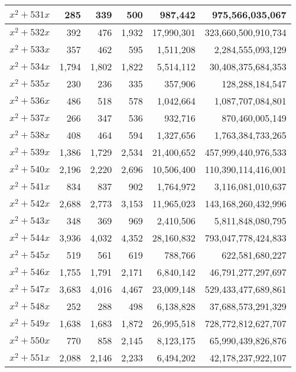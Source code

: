 \documentclass[a4paper]{amsproc}
\theoremstyle{plain}
\begin{document}
\begin{longtable}{ | l | r | r | r | r | r | }
$x^2 + 531x$ & 285 & 339 & 500 & 987{,}442 & 975{,}566{,}035{,}067 \\ \hline
$x^2 + 532x$ & 392 & 476 & 1{,}932 & 17{,}990{,}301 & 323{,}660{,}500{,}910{,}734 \\ \hline
$x^2 + 533x$ & 357 & 462 & 595 & 1{,}511{,}208 & 2{,}284{,}555{,}093{,}129 \\ \hline
$x^2 + 534x$ & 1{,}794 & 1{,}802 & 1{,}822 & 5{,}514{,}112 & 30{,}408{,}375{,}684{,}353 \\ \hline
$x^2 + 535x$ & 230 & 236 & 335 & 357{,}906 & 128{,}288{,}184{,}547 \\ \hline
$x^2 + 536x$ & 486 & 518 & 578 & 1{,}042{,}664 & 1{,}087{,}707{,}084{,}801 \\ \hline
$x^2 + 537x$ & 266 & 347 & 536 & 932{,}716 & 870{,}460{,}005{,}149 \\ \hline
$x^2 + 538x$ & 408 & 464 & 594 & 1{,}327{,}656 & 1{,}763{,}384{,}733{,}265 \\ \hline
$x^2 + 539x$ & 1{,}386 & 1{,}729 & 2{,}534 & 21{,}400{,}652 & 457{,}999{,}440{,}976{,}533 \\ \hline
$x^2 + 540x$ & 2{,}196 & 2{,}220 & 2{,}696 & 10{,}506{,}400 & 110{,}390{,}114{,}416{,}001 \\ \hline
$x^2 + 541x$ & 834 & 837 & 902 & 1{,}764{,}972 & 3{,}116{,}081{,}010{,}637 \\ \hline
$x^2 + 542x$ & 2{,}688 & 2{,}773 & 3{,}153 & 11{,}965{,}023 & 143{,}168{,}260{,}432{,}996 \\ \hline
$x^2 + 543x$ & 348 & 369 & 969 & 2{,}410{,}506 & 5{,}811{,}848{,}080{,}795 \\ \hline
$x^2 + 544x$ & 3{,}936 & 4{,}032 & 4{,}352 & 28{,}160{,}832 & 793{,}047{,}778{,}424{,}833 \\ \hline
$x^2 + 545x$ & 519 & 561 & 619 & 788{,}766 & 622{,}581{,}680{,}227 \\ \hline
$x^2 + 546x$ & 1{,}755 & 1{,}791 & 2{,}171 & 6{,}840{,}142 & 46{,}791{,}277{,}297{,}697 \\ \hline
$x^2 + 547x$ & 3{,}683 & 4{,}016 & 4{,}467 & 23{,}009{,}148 & 529{,}433{,}477{,}689{,}861 \\ \hline
$x^2 + 548x$ & 252 & 288 & 498 & 6{,}138{,}828 & 37{,}688{,}573{,}291{,}329 \\ \hline
$x^2 + 549x$ & 1{,}638 & 1{,}683 & 1{,}872 & 26{,}995{,}518 & 728{,}772{,}812{,}627{,}707 \\ \hline
$x^2 + 550x$ & 770 & 858 & 2{,}145 & 8{,}123{,}175 & 65{,}990{,}439{,}826{,}876 \\ \hline
$x^2 + 551x$ & 2{,}088 & 2{,}146 & 2{,}233 & 6{,}494{,}202 & 42{,}178{,}237{,}922{,}107 \\ \hline

\end{longtable}
\end{document}
